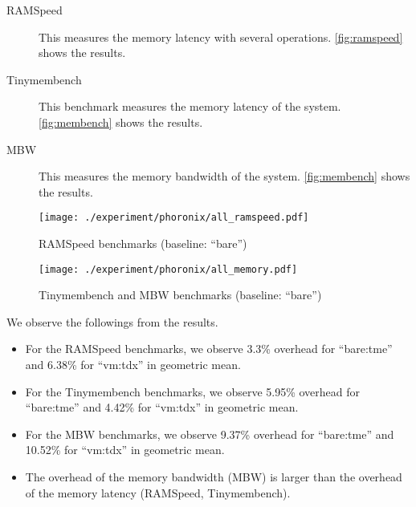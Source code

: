 \documentclass[letterpaper,twocolumn,10pt]{article}
\begin{document}
\begin{description}
\item[RAMSpeed~\cite{ramspeed}] This measures the memory latency with several operations. \autoref{fig:ramspeed} shows the results.
\item[Tinymembench~\cite{tinymembench}] This benchmark measures the memory latency of the system. \autoref{fig:membench} shows the results.
\item[MBW~\cite{mbw}] This measures the memory bandwidth of the system. \autoref{fig:membench} shows the results.
\end{description}

\begin{figure*}[t]
\centering
\texttt{[image: ./experiment/phoronix/all\_ramspeed.pdf]}
\caption{RAMSpeed benchmarks (baseline: ``bare'')}
\label{fig:ramspeed}
\end{figure*}

\begin{figure*}[t]
\centering
\texttt{[image: ./experiment/phoronix/all\_memory.pdf]}
\caption{Tinymembench and MBW benchmarks (baseline: ``bare'')}
\label{fig:membench}
\end{figure*}


We observe the followings from the results.
\begin{itemize}
    \item For the RAMSpeed benchmarks, we observe 3.3\% overhead for ``bare:tme'' and 6.38\% for ``vm:tdx'' in geometric mean.
    \item For the Tinymembench benchmarks, we observe 5.95\% overhead for ``bare:tme'' and 4.42\% for ``vm:tdx'' in geometric mean.
    \item For the MBW benchmarks, we observe 9.37\% overhead for ``bare:tme'' and 10.52\% for ``vm:tdx'' in geometric mean.
    \item The overhead of the memory bandwidth (MBW) is larger than the overhead of the memory latency (RAMSpeed, Tinymembench).
\end{itemize}
\end{document}
